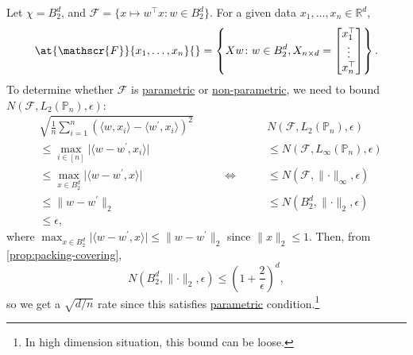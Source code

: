 \begin{eg}
	Let \(\chi = B_2^d\), and \(\mathscr{F} = \{ x \mapsto w^{\top} x \colon w\in B_2^d \} \). For a given data \(x_1, \dots , x_n \in \mathbb{R} ^d\),
	\[
		\at{\mathscr{F}}{x_1, \dots , x_n}{} = \left\{ X w \colon w\in B_2^d, X_{n \times d} = \begin{bmatrix}
			x_1 ^{\top} \\
			\vdots      \\
			x_n ^{\top} \\
		\end{bmatrix} \right\}.
	\]
	To determine whether \(\mathscr{F} \) is \hyperref[def:parametric]{parametric} or \hyperref[def:non-parametric]{non-parametric}, we need to bound \(N(\mathscr{F} , L_2(\mathbb{P} _n), \epsilon )\):
	\[
		\begin{alignedat}{4}
			 & \sqrt{\frac{1}{n}\sum_{i=1}^{n} \left( \langle w, x_i \rangle - \langle w^{\prime} , x_i \rangle \right) ^2 } &                    & N(\mathscr{F} , L_2(\mathbb{P} _n), \epsilon )                \\
			 & \leq \max _{i\in[n]} \vert \langle w-w^{\prime} , x_i \rangle \vert                                           &                    & \leq N(\mathscr{F} , L_\infty (\mathbb{P} _n), \epsilon )     \\
			 & \leq \max _{x\in B_2^d} \vert \langle w - w^{\prime} , x \rangle  \vert                                       & \qquad \iff \qquad & \leq N(\mathscr{F} , \lVert \cdot \rVert _\infty , \epsilon ) \\
			 & \leq \lVert w - w^{\prime} \rVert _2                                                                          &                    & \leq N(B_2^d, \lVert \cdot \rVert _2, \epsilon )              \\
			 & \leq \epsilon,                                                                                                &                    &
		\end{alignedat}
	\]
	where \(\max _{x\in B_2^d} \vert \langle w - w^{\prime} , x \rangle \vert \leq \lVert w - w^{\prime}  \rVert _2\) since \(\lVert x \rVert _2 \leq 1\). Then, from \autoref{prop:packing-covering},
	\[
		N(B_2^d, \lVert \cdot \rVert _2, \epsilon )
		\leq \left( 1 + \frac{2}{\epsilon } \right)^d,
	\]
	so we get a \(\sqrt{d / n} \) rate since this satisfies \hyperref[def:parametric]{parametric} condition.\footnote{In high dimension situation, this bound can be loose.}
\end{eg}

